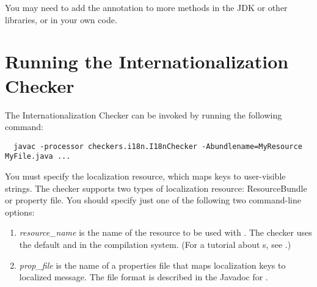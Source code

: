 You may need to add the  annotation to more methods in the
JDK or other libraries, or in your own code.


\section{Running the Internationalization Checker\label{i18n-running}}

The Internationalization Checker can be invoked by running the following
command:

\begin{Verbatim}
  javac -processor checkers.i18n.I18nChecker -Abundlename=MyResource MyFile.java ...
\end{Verbatim}

You must specify the localization resource, which maps keys to user-visible
strings.  The checker supports two types of localization resource:
ResourceBundle or property file.  You should specify just one of the
following two command-line options:

\begin{enumerate}

\item {}

  \emph{resource\_name} is the name of the resource to be used with
  .
  The checker uses the default  and  in the
  compilation system.
  (For a tutorial about s, see
  .)

\item {}

  \emph{prop\_file} is the name of a properties file that maps
  localization keys to localized message.  The file format is described in
  the Javadoc for 
  .

\end{enumerate}
